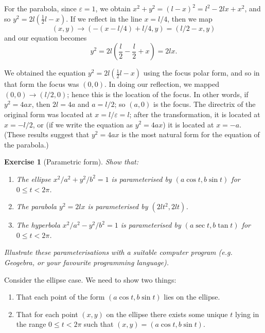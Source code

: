 \documentclass[a4paper,leqno,10pt]{article}
\theoremstyle{exercise}
\newtheorem{Exercise}{Exercise}
\newenvironment{exercise}
  {\begin{mdframed}\begin{Exercise}}
  {\end{Exercise}\end{mdframed}}
\theoremstyle{plain}
\theoremstyle{definition}
\theoremstyle{remark}
\begin{document}
For the parabola, since $ \varepsilon = 1 $, we obtain $ x^2 + y^2 = (l - x)^2 = l^2 - 2lx + x^2 $, and so $ y^2 = 2l(\frac{1}{2}l - x) $.
If we reflect in the line $ x = l/4 $, then we map
\begin{displaymath}
  (x,y) \to (-(x - l/4) + l/4, y) = (l/2 - x, y)
\end{displaymath}
and our equation becomes
\begin{displaymath}
  y^2 = 2l\left(\frac{l}{2} - \frac{l}{2} + x \right) = 2lx.
\end{displaymath}

We obtained the equation $ y^2 = 2l(\frac{1}{2}l - x) $ using the focus polar form, and so in that form the focus was $ (0,0) $. In doing
our reflection, we mapped $ (0,0) \to (l/2,0) $; hence this is the location of the focus. In other words, if $ y^2 = 4ax $, then $ 2l = 4a $
and $ a = l/2 $; so $ (a,0) $ is the focus. The directrix of the original form was located at $ x = l/\varepsilon = l $; after the transformation,
it is located at $ x = -l/2 $, or (if we write the equation as $ y^2 = 4ax $) it is located at $ x = -a $. (These results suggest that $ y^2 = 4ax $
is the most natural form for the equation of the parabola.)

\begin{exercise}[Parametric form]
  Show that:
  \begin{enumerate}
    \item The ellipse $ x^2/a^2 + y^2/b^2 = 1 $ is parameterised by $ (a \cos t, b \sin t) $ for $ 0 \leq t < 2\pi $.
    \item The parabola $ y^2 = 2lx $ is parameterised by $ (2lt^2, 2lt) $.
    \item The hyperbola $ x^2/a^2 - y^2/b^2 = 1 $ is parameterised by $ (a \sec t, b \tan t) $ for $ 0 \leq t < 2\pi $.
  \end{enumerate}
  Illustrate these parameterisations with a suitable computer program (e.g. Geogebra, or your favourite programming language).
\end{exercise}

Consider the ellipse case. We need to show two things:
\renewcommand{\labelenumi}{\Roman{enumi}.}
\begin{enumerate}
  \item That each point of the form $ (a \cos t, b \sin t) $ lies on the ellipse.
  \item That for each point $(x,y)$ on the ellipse there exists some unique $ t $ lying in the range $ 0 \leq t < 2\pi $
        such that $ (x,y) = (a \cos t, b \sin t) $.
\end{enumerate}
\end{document}
